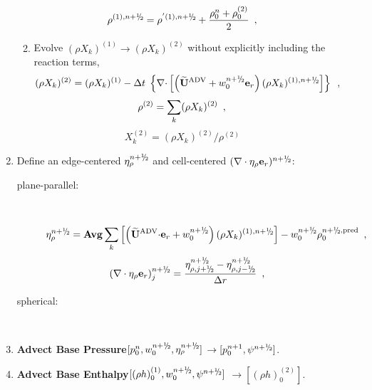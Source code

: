 \begin{description}
\begin{enumerate}
\begin{enumerate}
\begin{equation}
\rho^{(1),\nph} = \rho^{'(1),\nph} + \frac{\rho_0^n + \rho_0^{(2)}}{2}\enskip ,
\end{equation}

    \item Evolve $(\rho X_k)^{(1)} \rightarrow (\rho X_k)^{(2)}$
      without explicitly including the reaction terms,
\begin{equation}
(\rho X_k)^{(2)} = (\rho X_k)^{(1)} 
- \dt \; \left\{ \nablab \cdotb \left[\left(\uadvtwo+w_0^{\nph} \er\right)  
(\rho X_k)^{(1),\nph} \right] \right\}  \enskip ,
\end{equation}
\begin{equation}
\rho^{(2)} = \sum_k (\rho X_k)^{(2)} \enskip ,
\end{equation}
\begin{equation}
X_k^{(2)} = (\rho X_k)^{(2)} / \rho^{(2)}
\end{equation}

\end{enumerate}

\item Define an edge-centered $\etarho^{\nph}$ and cell-centered 
$(\nabla\cdot\etarho\er)^{\nph}$:

\begin{description}

\item[plane-parallel:] ~

\begin{equation}
 \etarho^{\nph} = {\rm {\bf Avg}} \sum_k \left [\left(\uadvtwo \cdotb \er + w_0^{\nph}\right) (\rho X_k)^{(1),\nph} \right] - w_0^{\nph} \rho_0^{\nph,{\rm pred}} \enskip ,
\end{equation}
\begin{equation}
(\nabla\cdot\etarho\er)_j^{\nph} = \frac{\eta_{\rho,j+\myhalf}^{\nph} - \eta_{\rho,j-\myhalf}^{\nph}}{\Delta r} \enskip , \\
\end{equation}

\item[spherical:]~

\end{description}

\item {\bf Advect Base Pressure}$[p_0^{n}, w_0^{\nph}, \etarho^{n+\myhalf}]$ 
$\rightarrow [p_0^{n+1}, \psi^{n+\myhalf}]$.

\item {\bf Advect Base Enthalpy}$[(\rho h)_0^{(1)}, w_0^{\nph}, \psi^{\nph}]$ 
$\rightarrow [(\rho h)_0^{(2)}]$.


\end{enumerate}
\end{description}
